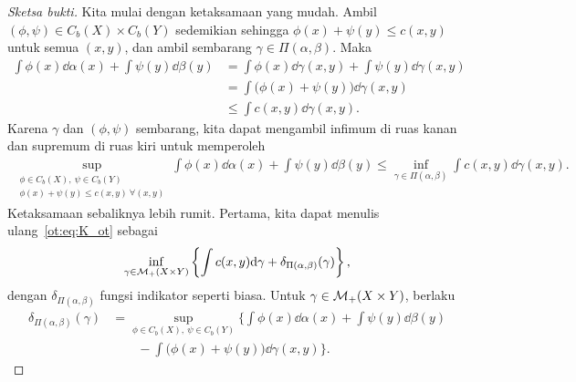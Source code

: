 \begin{proof}[Sketsa bukti]
    Kita mulai dengan ketaksamaan yang mudah. Ambil $(\phi,\psi)\in C_b(X)\times C_b(Y)$ sedemikian sehingga $\phi(x)+\psi(y)\leq c(x,y)$ untuk semua $(x,y)$, dan ambil sembarang $\gamma\in\Pi(\alpha,\beta)$. Maka
    \begin{equation}
        \begin{aligned}
            \int\phi(x)\dd\alpha(x)+\int\psi(y)\dd\beta(y)
            &= \int\phi(x)\dd\gamma(x,y)+\int\psi(y)\dd\gamma(x,y)\\
            &= \int\big(\phi(x)+\psi(y)\big)\dd\gamma(x,y)\\
            &\leq \int c(x,y)\dd\gamma(x,y).
        \end{aligned}
    \end{equation}
    Karena $\gamma$ dan $(\phi,\psi)$ sembarang, kita dapat mengambil infimum di ruas kanan dan supremum di ruas kiri untuk memperoleh
    \begin{equation}
        \begin{aligned}
            \sup_{\substack{\phi\in C_b(X),\ \psi\in C_b(Y)\\
            \phi(x)+\psi(y)\leq c(x,y)\ \forall(x,y)}}
            \int\phi(x)\dd\alpha(x)+\int\psi(y)\dd\beta(y)
            \leq \inf_{\gamma\in\Pi(\alpha,\beta)}
            \int c(x,y)\dd\gamma(x,y).
        \end{aligned}
    \end{equation}
    Ketaksamaan sebaliknya lebih rumit.
    Pertama, kita dapat menulis ulang~\eqref{ot:eq:K_ot} sebagai
    \begin{equation}
        \inf_{\gamma\in\mathcal{M}_+(X\times Y)}
        \left\{\int c(x,y)\mathrm{d}\gamma+\delta_{\Pi(\alpha,\beta)}(\gamma)\right\},
    \end{equation}
    dengan $\delta_{\Pi(\alpha,\beta)}$ fungsi indikator seperti biasa. Untuk $\gamma\in\mathcal{M}_+(X\times Y)$, berlaku
    \begin{equation}\label{ot:eq:duality}
        \begin{aligned}
            \delta_{\Pi(\alpha,\beta)}(\gamma)
            &= \sup_{\phi\in C_b(X),\ \psi\in C_b(Y)}
            \bigg\{\int\phi(x)\dd\alpha(x)+\int\psi(y)\dd\beta(y)\\
            &\qquad-\int\big(\phi(x)+\psi(y)\big)\dd\gamma(x,y)\bigg\}.
        \end{aligned}

\end{equation}
\end{proof}
